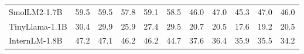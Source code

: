 \documentclass[letterpaper]{article}
\begin{document}
\begin{table}[t]
{\begin{tabular}{lccccc|ccccc}
SmolLM2-1.7B & \cellcolor[HTML]{F9F1CD}59.5 & \cellcolor[HTML]{F8F0CD}59.5 & \cellcolor[HTML]{F6F0CE}57.8 & \cellcolor[HTML]{F2EFCE}59.1 & \cellcolor[HTML]{F4F0CE}58.5 & \cellcolor[HTML]{FFF1CC}46.0 & \cellcolor[HTML]{FDF2CC}47.0 & \cellcolor[HTML]{FBF1CD}45.3 & \cellcolor[HTML]{F5F0CE}47.0 & \cellcolor[HTML]{F8F0CD}46.0 \\
TinyLlama-1.1B & \cellcolor[HTML]{F4CCCC}30.4 & \cellcolor[HTML]{F4CCCC}29.9 & \cellcolor[HTML]{F4CCCC}25.9 & \cellcolor[HTML]{F5D0CC}27.4 & \cellcolor[HTML]{F6D2CC}29.5 & \cellcolor[HTML]{F4CCCC}20.7 & \cellcolor[HTML]{F4CCCC}20.5 & \cellcolor[HTML]{F4CCCC}17.6 & \cellcolor[HTML]{F6D1CC}19.2 & \cellcolor[HTML]{F6D3CC}20.5 \\
InternLM-1.8B & \cellcolor[HTML]{FBE5CC}47.2 & \cellcolor[HTML]{FCE6CC}47.1 & \cellcolor[HTML]{FDEACC}46.2 & \cellcolor[HTML]{FDECCC}46.2 & \cellcolor[HTML]{FCE9CC}44.7 & \cellcolor[HTML]{FBE5CC}37.6 & \cellcolor[HTML]{FBE4CC}36.4 & \cellcolor[HTML]{FCE8CC}35.9 & \cellcolor[HTML]{FDEACC}35.5 & \cellcolor[HTML]{FCE8CC}34.2 \\
\bottomrule
\end{tabular}%
}
\end{table}



\end{document}
